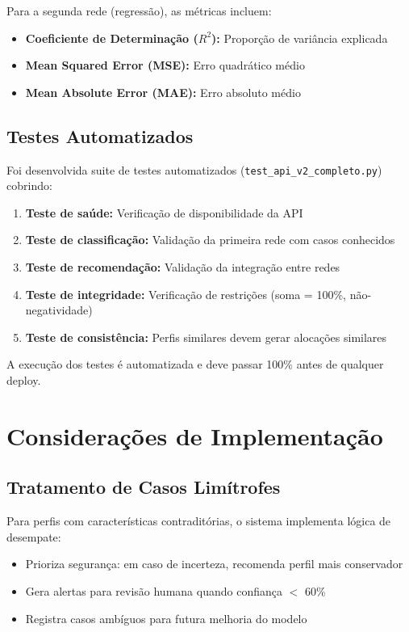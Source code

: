 Para a segunda rede (regressão), as métricas incluem:
\begin{itemize}
    \item \textbf{Coeficiente de Determinação ($R^2$):} Proporção de variância explicada
    \item \textbf{Mean Squared Error (MSE):} Erro quadrático médio
    \item \textbf{Mean Absolute Error (MAE):} Erro absoluto médio
\end{itemize}

\subsection{Testes Automatizados}

Foi desenvolvida suite de testes automatizados (\texttt{test\_api\_v2\_completo.py}) cobrindo:

\begin{enumerate}
    \item \textbf{Teste de saúde:} Verificação de disponibilidade da API
    \item \textbf{Teste de classificação:} Validação da primeira rede com casos conhecidos
    \item \textbf{Teste de recomendação:} Validação da integração entre redes
    \item \textbf{Teste de integridade:} Verificação de restrições (soma = 100\%, não-negatividade)
    \item \textbf{Teste de consistência:} Perfis similares devem gerar alocações similares
\end{enumerate}

A execução dos testes é automatizada e deve passar 100\% antes de qualquer deploy.

\section{Considerações de Implementação}

\subsection{Tratamento de Casos Limítrofes}

Para perfis com características contraditórias, o sistema implementa lógica de desempate:

\begin{itemize}
    \item Prioriza segurança: em caso de incerteza, recomenda perfil mais conservador
    \item Gera alertas para revisão humana quando confiança $<$ 60\%
    \item Registra casos ambíguos para futura melhoria do modelo
\end{itemize}

